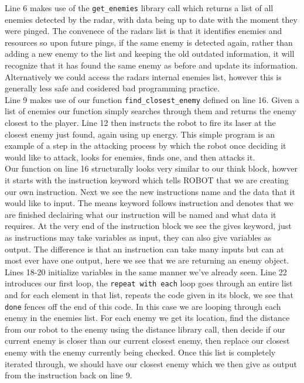 \documentclass[a4paper]{article}
\begin{document}
Line 6 makes use of the \texttt{get\_enemies} library call which returns a list of all enemies detected by the radar, with data being up to date with the moment they were pinged. The convenece of the radars list is that it identifies enemies and resources so upon future pings, if the same enemy is detected again, rather than adding a new enemy to the list and keeping the old outdated information, it will recognize that it has found the same enemy as before and update its information. Alternatively we could access the radars internal enemies list, however this is generally less safe and cosidered bad programming practice.\\

Line 9 makes use of our function \texttt{find\_closest\_enemy} defined on line 16. Given a list of enemies our function simply searches through them and returns the enemy closest to the player. Line 12 then instructs the robot to fire its laser at the closest enemy just found, again using up energy. This simple program is an example of a step in the attacking process by which the robot once deciding it would like to attack, looks for enemies, finds one, and then attacks it.\\

Our function on line 16 structurally looks very similar to our think block, howver it starts with the instruction keyword which tells ROBOT that we are creating our own instruction. Next we see the new instructions name and the data that it would like to input. The means keyword follows instruction and denotes that we are finished declairing what our instruction will be named and what data it requires. At the very end of the instruction block we see the gives keyword, just as instructions may take variables as input, they can also give variables as output. The difference is that an instruction can take many inputs but can at most ever have one output, here we see that we are returning an enemy object. Lines 18-20 initialize variables in the same manner we've already seen. Line 22 introduces our first loop, the \texttt{repeat with each} loop goes through an entire list and for each element in that list, repeats the code given in its block, we see that \texttt{done} fences off the end of this code. In this case we are looping through each enemy in the enemies list. For each enemy we get its location, find the distance from our robot to the enemy using the distance library call, then decide if our current enemy is closer than our current closest enemy, then replace our closest enemy with the enemy currently being checked. Once this list is completely iterated through, we should have our closest enemy which we then give as output from the instruction back on line 9.\\
\end{document}
